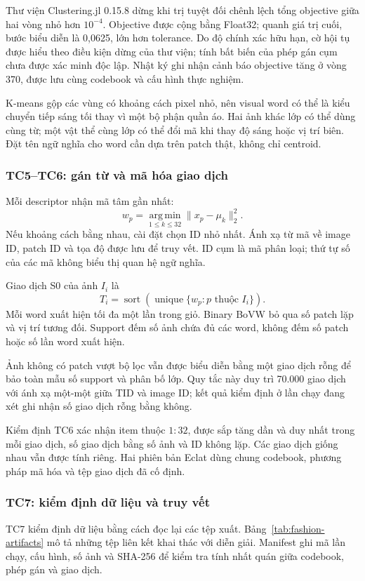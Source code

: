 Thư viện Clustering.jl 0.15.8 dừng khi trị tuyệt đối chênh lệch tổng
objective giữa hai vòng nhỏ hơn $10^{-4}$. Objective được cộng bằng
Float32; quanh giá trị cuối, bước biểu diễn là 0,0625, lớn hơn tolerance.
Do độ chính xác hữu hạn, cờ hội tụ được hiểu theo điều kiện dừng của
thư viện; tính bất biến của phép gán cụm chưa được xác minh độc lập.
Nhật ký ghi nhận cảnh báo objective tăng ở vòng 370, được lưu cùng
codebook và cấu hình thực nghiệm.

K-means gộp các vùng có khoảng cách pixel nhỏ, nên visual word có thể là
kiểu chuyển tiếp sáng tối thay vì một bộ phận quần áo. Hai ảnh khác lớp
có thể dùng cùng từ; một vật thể cùng lớp có thể đổi mã khi thay độ sáng
hoặc vị trí biên. Đặt tên ngữ nghĩa cho word cần dựa trên patch thật,
không chỉ centroid.

\subsubsection{TC5--TC6: gán từ và mã hóa giao dịch}
Mỗi descriptor nhận mã tâm gần nhất:
\begin{equation}
w_p=\operatorname*{arg\,min}_{1\leq k\leq32}\|x_p-\mu_k\|_2^2.
\end{equation}
Nếu khoảng cách bằng nhau, cài đặt chọn ID nhỏ nhất. Ánh xạ từ mã về
image ID, patch ID và tọa độ được lưu để truy vết. ID cụm là mã phân
loại; thứ tự số của các mã không biểu thị quan hệ ngữ nghĩa.

Giao dịch S0 của ảnh $I_i$ là
\begin{equation}
T_i=\operatorname{sort}\!\left(\operatorname{unique}
 \{w_p:p\text{ thuộc }I_i\}\right).
\label{eq:s0}
\end{equation}
Mỗi word xuất hiện tối đa một lần trong giỏ. Binary BoVW bỏ qua số patch
lặp và vị trí tương đối. Support đếm số ảnh chứa đủ các word, không đếm
số patch hoặc số lần word xuất hiện.

Ảnh không có patch vượt bộ lọc vẫn được biểu diễn bằng một giao dịch
rỗng để bảo toàn mẫu số support và phân bố lớp. Quy tắc này duy trì
70.000 giao dịch với ánh xạ một-một giữa TID và image ID; kết quả kiểm
định ở lần chạy đang xét ghi nhận số giao dịch rỗng bằng không.

Kiểm định TC6 xác nhận item thuộc $1{:}32$, được sắp tăng dần và duy
nhất trong mỗi giao dịch, số giao dịch bằng số ảnh và ID không lặp.
Các giao dịch giống nhau vẫn được tính riêng. Hai phiên bản Eclat dùng
chung codebook, phương pháp mã hóa và tệp giao dịch đã cố định.

\subsubsection{TC7: kiểm định dữ liệu và truy vết}
TC7 kiểm định dữ liệu bằng cách đọc lại các tệp xuất.
Bảng~\ref{tab:fashion-artifacts} mô tả những tệp liên kết khai thác với
diễn giải. Manifest ghi mã lần chạy, cấu hình, số ảnh và SHA-256 để
kiểm tra tính nhất quán giữa codebook, phép gán và giao dịch.

